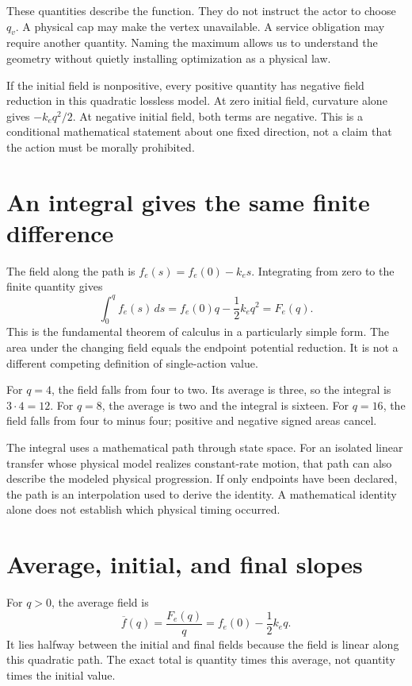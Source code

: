 These quantities describe the function. They do not instruct the actor to choose \(q_v\). A physical cap may make the vertex unavailable. A service obligation may require another quantity. Naming the maximum allows us to understand the geometry without quietly installing optimization as a physical law.

If the initial field is nonpositive, every positive quantity has negative field reduction in this quadratic lossless model. At zero initial field, curvature alone gives \(-k_e q^2/2\). At negative initial field, both terms are negative. This is a conditional mathematical statement about one fixed direction, not a claim that the action must be morally prohibited.

\section{An integral gives the same finite difference}
The field along the path is \(f_e(s)=f_e(0)-k_e s\). Integrating from zero to the finite quantity gives
\begin{equation}
 \int_0^q f_e(s)\,ds=f_e(0)q-\frac12 k_e q^2=F_e(q).
\end{equation}
This is the fundamental theorem of calculus in a particularly simple form. The area under the changing field equals the endpoint potential reduction. It is not a different competing definition of single-action value.

For \(q=4\), the field falls from four to two. Its average is three, so the integral is \(3\cdot4=12\). For \(q=8\), the average is two and the integral is sixteen. For \(q=16\), the field falls from four to minus four; positive and negative signed areas cancel.

The integral uses a mathematical path through state space. For an isolated linear transfer whose physical model realizes constant-rate motion, that path can also describe the modeled physical progression. If only endpoints have been declared, the path is an interpolation used to derive the identity. A mathematical identity alone does not establish which physical timing occurred.

\section{Average, initial, and final slopes}
For \(q>0\), the average field is
\begin{equation}
 \overline f(q)=\frac{F_e(q)}{q}=f_e(0)-\frac12 k_e q.
\end{equation}
It lies halfway between the initial and final fields because the field is linear along this quadratic path. The exact total is quantity times this average, not quantity times the initial value.

